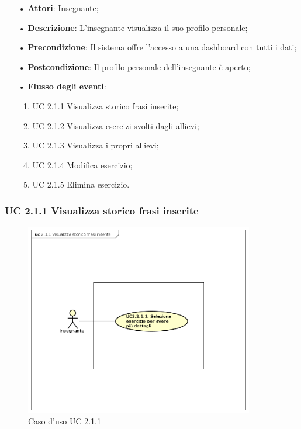\begin{itemize}
	\item[•] \textbf{Attori}: Insegnante;
	\item[•] \textbf{Descrizione}: L’insegnante visualizza il suo profilo personale;

	\item[•] \textbf{Precondizione}: Il sistema offre l’accesso a una dashboard con tutti i dati;

	\item[•] \textbf{Postcondizione}:  Il profilo personale dell’insegnante è aperto;
	\item[•] \textbf{Flusso degli eventi}:
		\begin{enumerate}
			\item UC 2.1.1 Visualizza storico frasi inserite;
			\item UC 2.1.2 Visualizza esercizi svolti dagli allievi;
			\item UC 2.1.3 Visualizza i propri allievi;
			\item UC 2.1.4 Modifica esercizio;
			\item UC 2.1.5 Elimina esercizio.
		\end{enumerate}
\end{itemize}

\subsubsection{UC 2.1.1  Visualizza storico frasi inserite}

\begin{figure}[H]
\centering
\includegraphics[width=10cm]{img/UC211.png} 
\caption{Caso d'uso UC 2.1.1}
\end{figure}


